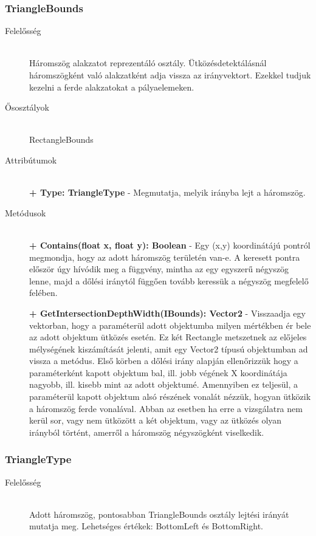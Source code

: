 \subsubsection{TriangleBounds}
	\begin{description}
		\item[Felelősség] \hfill \\
		Háromszög alakzatot reprezentáló osztály. Ütközésdetektálásnál háromszögként való alakzatként adja vissza az irányvektort. Ezekkel tudjuk kezelni a ferde alakzatokat a pályaelemeken.
			
		\item[Ősosztályok] \hfill \\
		RectangleBounds

		\item[Attribútumok] \hfill \\
		\textbf{+ Type: TriangleType} - Megmutatja, melyik irányba lejt a háromszög.

		\item[Metódusok]\hfill \\
		\textbf{+ Contains(float x, float y): Boolean} - Egy (x,y) koordinátájú pontról megmondja, hogy az adott háromszög területén van-e. A keresett pontra először úgy hívódik meg a függvény, mintha az egy egyszerű négyszög lenne, majd a dőlési iránytól függően tovább keressük a négyszög megfelelő felében.

		\textbf{+ GetIntersectionDepthWidth(IBounds): Vector2} - Visszaadja egy vektorban, hogy a paraméterül adott objektumba milyen mértékben ér bele az adott objektum ütközés esetén. Ez két Rectangle metszetnek az előjeles mélységének kiszámítását jelenti, amit egy Vector2 típusú objektumban ad vissza a metódus. Első körben a dőlési irány alapján ellenőrizzük hogy a paraméterként kapott objektum bal, ill. jobb végének X koordinátája nagyobb, ill. kisebb mint az adott objektumé. Amennyiben ez teljesül, a paraméterül kapott objektum alsó részének vonalát nézzük, hogyan ütközik a háromszög ferde vonalával. Abban az esetben ha erre a vizsgálatra nem kerül sor, vagy nem ütközött a két objektum, vagy az ütközés olyan irányból történt, amerről a háromszög négyszögként viselkedik.
		
	\end{description}
	
\subsubsection{TriangleType}
	\begin{description}
		\item[Felelősség] \hfill \\
		Adott háromszög, pontosabban TriangleBounds osztály lejtési irányát mutatja meg. Lehetséges értékek: BottomLeft és BottomRight.
		
	\end{description}
	
